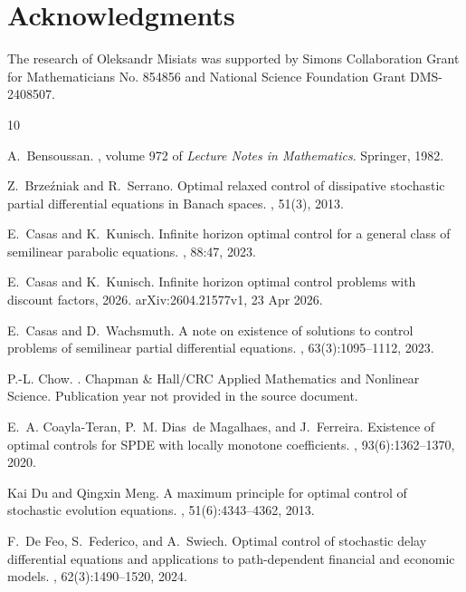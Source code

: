 \documentclass[a4paper,12pt]{article}
\numberwithin{equation}{section}
\begin{document}
\section*{Acknowledgments}  The research of Oleksandr Misiats was supported by Simons Collaboration
Grant for Mathematicians No. 854856 and National Science Foundation Grant DMS-2408507. 
\begin{thebibliography}{10}

A.~Bensoussan.
, volume 972 of {\em Lecture Notes in Mathematics}.
\newblock Springer, 1982.

Z.~Brze{\'z}niak and R.~Serrano.
\newblock Optimal relaxed control of dissipative stochastic partial differential equations in {Banach} spaces.
, 51(3), 2013.

E.~Casas and K.~Kunisch.
\newblock Infinite horizon optimal control for a general class of semilinear parabolic equations.
, 88:47, 2023.

E.~Casas and K.~Kunisch.
\newblock Infinite horizon optimal control problems with discount factors, 2026.
\newblock arXiv:2604.21577v1, 23 Apr 2026.

E.~Casas and D.~Wachsmuth.
\newblock A note on existence of solutions to control problems of semilinear partial differential equations.
, 63(3):1095--1112, 2023.

P.-L. Chow.
.
\newblock Chapman \& Hall/CRC Applied Mathematics and Nonlinear Science.
\newblock Publication year not provided in the source document.

E.~A. Coayla-Teran, P.~M. Dias~de Magalhaes, and J.~Ferreira.
\newblock Existence of optimal controls for {SPDE} with locally monotone coefficients.
, 93(6):1362--1370, 2020.

Kai Du and Qingxin Meng.
\newblock A maximum principle for optimal control of stochastic evolution equations.
, 51(6):4343--4362, 2013.

F.~De Feo, S.~Federico, and A.~Swiech.
\newblock Optimal control of stochastic delay differential equations and applications to path-dependent financial and economic models.
, 62(3):1490--1520, 2024.


\end{thebibliography}
\end{document}
